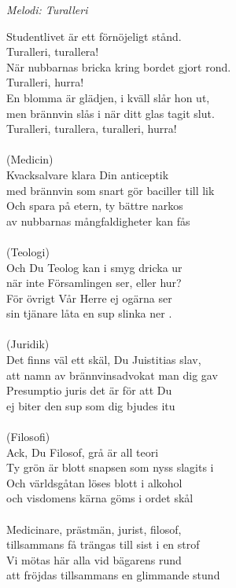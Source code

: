 {\footnotesize\textit{Melodi: Turalleri}}\par
\vspace{10pt}
Studentlivet är ett förnöjeligt stånd.\\
Turalleri, turallera!\\
När nubbarnas bricka kring bordet gjort rond.\\
Turalleri, hurra!\\
En blomma är glädjen, i kväll slår hon ut,\\
men brännvin slås i när ditt glas tagit slut.\\
Turalleri, turallera, turalleri, hurra!\\
\\
(Medicin)\\
Kvacksalvare klara Din anticeptik \\
med brännvin som snart gör baciller till lik\\
Och spara på etern, ty bättre narkos\\
av nubbarnas mångfaldigheter kan fås \\
\\
(Teologi)\\
Och Du Teolog kan i smyg dricka ur \\
när inte Församlingen ser, eller hur? \\
För övrigt Vår Herre ej ogärna ser\\
sin tjänare låta en sup slinka ner .\\
\\
(Juridik)\\
Det finns väl ett skäl, Du Juistitias slav, \\
att namn av brännvinsadvokat man dig gav \\
Presumptio juris det är för att Du\\
ej biter den sup som dig bjudes itu \\
\\
(Filosofi)\\
Ack, Du Filosof, grå är all teori \\
Ty grön är blott snapsen som nyss slagits i \\
Och världsgåtan löses blott i alkohol\\
och visdomens kärna göms i ordet skål \\
\\
Medicinare, prästmän, jurist, filosof, \\
tillsammans få trängas till sist i en strof \\
Vi mötas här alla vid bägarens rund\\
att fröjdas tillsammans en glimmande stund
